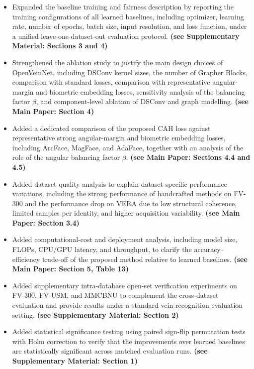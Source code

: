 \documentclass[11pt]{article}
\theoremstyle{remark}
\begin{document}
\begin{itemize}
    \item Expanded the baseline training and fairness description by reporting the training configurations of all learned baselines, including optimizer, learning rate, number of epochs, batch size, input resolution, and loss function, under a unified leave-one-dataset-out evaluation protocol. \textbf{(see Supplementary Material: Sections 3 and 4)}
    
    \item Strengthened the ablation study to justify the main design choices of OpenVeinNet, including DSConv kernel sizes, the number of Grapher Blocks, comparison with standard losses, comparison with representative angular-margin and biometric embedding losses, sensitivity analysis of the balancing factor $\beta$, and component-level ablation of DSConv and graph modelling. \textbf{(see Main Paper: Section 4)}
    
    \item Added a dedicated comparison of the proposed CAH loss against representative strong angular-margin and biometric embedding losses, including ArcFace, MagFace, and AdaFace, together with an analysis of the role of the angular balancing factor $\beta$. \textbf{(see Main Paper: Sections 4.4 and 4.5)}
    
    \item Added dataset-quality analysis to explain dataset-specific performance variations, including the strong performance of handcrafted methods on FV-300 and the performance drop on VERA due to low structural coherence, limited samples per identity, and higher acquisition variability. \textbf{(see Main Paper: Section 3.4)}
    
    \item Added computational-cost and deployment analysis, including model size, FLOPs, CPU/GPU latency, and throughput, to clarify the accuracy--efficiency trade-off of the proposed method relative to learned baselines. \textbf{(see Main Paper: Section 5, Table 13)}
    
    \item Added supplementary intra-database open-set verification experiments on FV-300, FV-USM, and MMCBNU to complement the cross-dataset evaluation and provide results under a standard vein-recognition evaluation setting. \textbf{(see Supplementary Material: Section 2)}
    
    \item Added statistical significance testing using paired sign-flip permutation tests with Holm correction to verify that the improvements over learned baselines are statistically significant across matched evaluation runs. \textbf{(see Supplementary Material: Section 1)}
    

\end{itemize}
\end{document}
